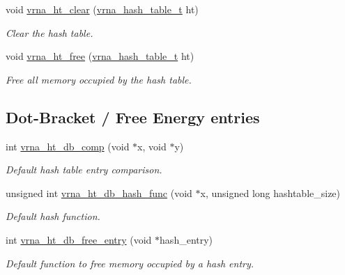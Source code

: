 \begin{DoxyCompactItemize}
void \hyperlink{group__hash__table__utils_gab90583f8f7395e735c865ad2ebdb3c29}{vrna\+\_\+ht\+\_\+clear} (\hyperlink{group__hash__table__utils_gabc7c6f41b718c8e23929e528891a89c4}{vrna\+\_\+hash\+\_\+table\+\_\+t} ht)
\begin{DoxyCompactList}\small\item\em Clear the hash table. \end{DoxyCompactList}\item 
void \hyperlink{group__hash__table__utils_ga479db024c70437aa2576d60b373c5262}{vrna\+\_\+ht\+\_\+free} (\hyperlink{group__hash__table__utils_gabc7c6f41b718c8e23929e528891a89c4}{vrna\+\_\+hash\+\_\+table\+\_\+t} ht)
\begin{DoxyCompactList}\small\item\em Free all memory occupied by the hash table. \end{DoxyCompactList}\end{DoxyCompactItemize}
\subsection*{Dot-\/\+Bracket / Free Energy entries}
\begin{DoxyCompactItemize}
\item 
int \hyperlink{group__hash__table__utils_gac4ec0b8372d50d7347a63f140f340962}{vrna\+\_\+ht\+\_\+db\+\_\+comp} (void $\ast$x, void $\ast$y)
\begin{DoxyCompactList}\small\item\em Default hash table entry comparison. \end{DoxyCompactList}\item 
unsigned int \hyperlink{group__hash__table__utils_gad133721a3cd2f8ca259fe315d86035a7}{vrna\+\_\+ht\+\_\+db\+\_\+hash\+\_\+func} (void $\ast$x, unsigned long hashtable\+\_\+size)
\begin{DoxyCompactList}\small\item\em Default hash function. \end{DoxyCompactList}\item 
int \hyperlink{group__hash__table__utils_gabcdcd0d070b3dfd2634a09e7838acf66}{vrna\+\_\+ht\+\_\+db\+\_\+free\+\_\+entry} (void $\ast$hash\+\_\+entry)
\begin{DoxyCompactList}\small\item\em Default function to free memory occupied by a hash entry. \end{DoxyCompactList}\end{DoxyCompactItemize}


